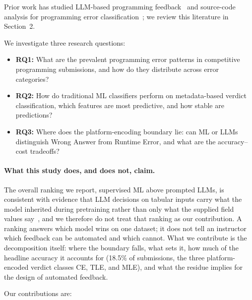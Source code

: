 \documentclass[acmsmall]{acmart}
\begin{document}
Prior work has studied LLM-based programming feedback~\cite{raihan2025large,finnie2022robots}
and source-code analysis for programming error classification~\cite{feng2020codebert};
we review this literature in Section~2.

We investigate three research questions:

\begin{itemize}
 \item \textbf{RQ1:} What are the prevalent programming error patterns in competitive
 programming submissions, and how do they distribute across error categories?
 \item \textbf{RQ2:} How do traditional ML classifiers perform on metadata-based
 verdict classification, which features are most predictive, and how stable are predictions?
 \item \textbf{RQ3:} Where does the platform-encoding boundary lie: can ML or LLMs distinguish
 Wrong Answer from Runtime Error, and what are the accuracy--cost tradeoffs?
\end{itemize}

\paragraph{What this study does, and does not, claim.} The overall ranking we
report, supervised ML above prompted LLMs, is consistent with evidence that
LLM decisions on tabular inputs carry what the model inherited during
pretraining rather than only what the supplied field values say~\cite{liu2024confronting}, and
we therefore do not treat that ranking as our contribution. A ranking answers
which model wins on one dataset; it does not tell an instructor which feedback can
be automated and which cannot. What we contribute is the decomposition itself:
where the boundary falls, what sets it, how much of the headline accuracy it
accounts for (18.5\% of submissions, the three platform-encoded verdict classes CE, TLE, and MLE), and what the residue implies for the
design of automated feedback.

Our contributions are:
\end{document}
